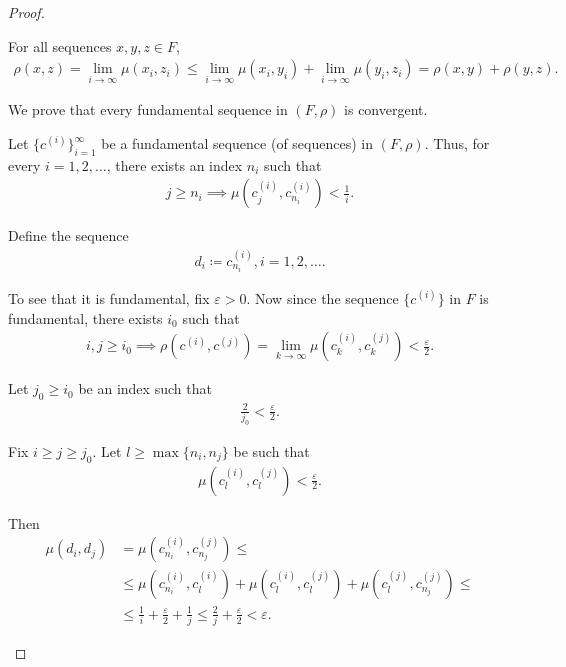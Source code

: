 \begin{proof}
\begin{defenum}
\begin{description}
       For all sequences \( x, y, z \in F \),
      \begin{align*}
        \rho(x, z) = \lim_{i \to \infty} \mu(x_i, z_i) \leq \lim_{i \to \infty} \mu(x_i, y_i) + \lim_{i \to \infty} \mu(y_i, z_i) = \rho(x, y) + \rho(y, z).
      \end{align*}
    \end{description}

    \item\label{thm:metric_space_completion_existence/part_b} We prove that every fundamental sequence in \( (F, \rho) \) is convergent.

    Let \( \{ c^{(i)} \}_{i=1}^\infty \) be a fundamental sequence (of sequences) in \( (F, \rho) \). Thus, for every \( i = 1, 2, \ldots \), there exists an index \( n_i \) such that
    \begin{align*}
      j \geq n_i \implies \mu(c_j^{(i)}, c_{n_i}^{(i)}) < \tfrac 1 i.
    \end{align*}

    Define the sequence
    \begin{align*}
      d_i \coloneqq c_{n_i}^{(i)}, i = 1, 2, \ldots.
    \end{align*}

    To see that it is fundamental, fix \( \varepsilon > 0 \). Now since the sequence \( \{ c^{(i)} \} \) in \( F \) is fundamental, there exists \( i_0 \) such that
    \begin{align*}
      i, j \geq i_0 \implies \rho(c^{(i)}, c^{(j)}) = \lim_{k \to \infty} \mu(c_k^{(i)}, c_k^{(j)}) < \frac \varepsilon 2.
    \end{align*}

    Let \( j_0 \geq i_0 \) be an index such that
    \begin{align*}
      \frac 2 {j_0} < \frac \varepsilon 2.
    \end{align*}

    Fix \( i \geq j \geq j_0 \). Let \( l \geq \max \{ n_i, n_j \} \) be such that
    \begin{align*}
      \mu(c_l^{(i)}, c_l^{(j)}) < \frac \varepsilon 2.
    \end{align*}

    Then
    \begin{align*}
      \mu(d_i, d_j)
      &=
      \mu(c_{n_i}^{(i)}, c_{n_j}^{(j)})
      \leq \\ &\leq
      \mu(c_{n_i}^{(i)}, c_l^{(i)}) + \mu(c_l^{(i)}, c_l^{(j)}) + \mu(c_l^{(j)}, c_{n_j}^{(j)})
      \leq \\ &\leq
      \frac 1 i + \frac \varepsilon 2 + \frac 1 j
      \leq
      \frac 2 j + \frac \varepsilon 2
      <
      \varepsilon.
    \end{align*}


\end{defenum}
\end{proof}
